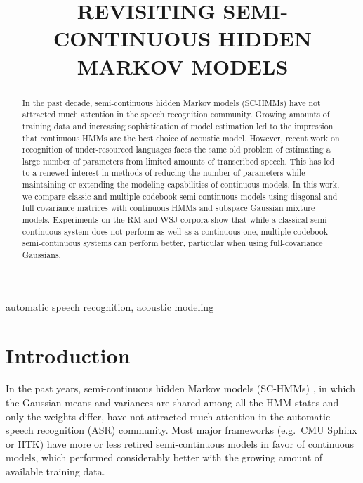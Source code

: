 \documentclass{article}
\title{REVISITING SEMI-CONTINUOUS HIDDEN MARKOV MODELS}
\begin{document}
\ninept

\maketitle

\begin{abstract}
In the past decade, semi-continuous hidden Markov models (SC-HMMs) have not 
attracted much attention in the speech recognition community. Growing amounts 
of training data and increasing sophistication of model estimation led to the 
impression that continuous HMMs are the best choice of acoustic model.
%
However, recent work on recognition of under-resourced languages faces the same
old problem of estimating a large number of parameters from limited amounts 
of transcribed speech.
This has led to a renewed interest in methods of reducing the number of parameters 
while maintaining or extending the modeling capabilities of continuous models.
%
In this work, we compare classic and multiple-codebook semi-continuous models
using diagonal and full covariance matrices with continuous HMMs and subspace Gaussian 
mixture models.  
Experiments on the RM and WSJ corpora show that while a classical semi-continuous
system does not perform as well as a continuous one, multiple-codebook semi-continuous
systems can perform better, particular when using full-covariance Gaussians.
\end{abstract}

\begin{keywords}
automatic speech recognition, acoustic modeling
\end{keywords}

\section{Introduction}
\label{sec:intro}
In the past years, semi-continuous hidden Markov models (SC-HMMs) \cite{huang1989shm},
in which the Gaussian means and variances are shared among all the HMM states
and only the weights differ, have not attracted much attention in the automatic 
speech recognition (ASR) community. 
Most major frameworks (e.g.~CMU {\sc Sphinx} or HTK) have more or less retired
semi-continuous models in favor of continuous models, which performed 
considerably better with the growing amount of available training data.
\end{document}
